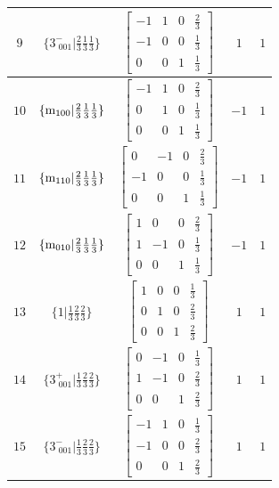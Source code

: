\documentclass[fleqn,8pt]{jsarticle}
\begin{document}
\begin{longtable}{ccccc}
$ 9 $ & $ \{3^{-}_{\,\,001}|\frac{2}{3} \frac{1}{3} \frac{1}{3}\} $ & $ \begin{bmatrix} -1 & 1 & 0 & \frac{2}{3} \\ -1 & 0 & 0 & \frac{1}{3} \\ 0 & 0 & 1 & \frac{1}{3} \end{bmatrix} $ & $ 1 $ & $ 1 $ \\ \hline
$ 10 $ & $ \{{\rm m}_{100}|\frac{2}{3} \frac{1}{3} \frac{1}{3}\} $ & $ \begin{bmatrix} -1 & 1 & 0 & \frac{2}{3} \\ 0 & 1 & 0 & \frac{1}{3} \\ 0 & 0 & 1 & \frac{1}{3} \end{bmatrix} $ & $ -1 $ & $ 1 $ \\ \hline
$ 11 $ & $ \{{\rm m}_{110}|\frac{2}{3} \frac{1}{3} \frac{1}{3}\} $ & $ \begin{bmatrix} 0 & -1 & 0 & \frac{2}{3} \\ -1 & 0 & 0 & \frac{1}{3} \\ 0 & 0 & 1 & \frac{1}{3} \end{bmatrix} $ & $ -1 $ & $ 1 $ \\ \hline
$ 12 $ & $ \{{\rm m}_{010}|\frac{2}{3} \frac{1}{3} \frac{1}{3}\} $ & $ \begin{bmatrix} 1 & 0 & 0 & \frac{2}{3} \\ 1 & -1 & 0 & \frac{1}{3} \\ 0 & 0 & 1 & \frac{1}{3} \end{bmatrix} $ & $ -1 $ & $ 1 $ \\ \hline
$ 13 $ & $ \{1|\frac{1}{3} \frac{2}{3} \frac{2}{3}\} $ & $ \begin{bmatrix} 1 & 0 & 0 & \frac{1}{3} \\ 0 & 1 & 0 & \frac{2}{3} \\ 0 & 0 & 1 & \frac{2}{3} \end{bmatrix} $ & $ 1 $ & $ 1 $ \\ \hline
$ 14 $ & $ \{3^{+}_{\,\,001}|\frac{1}{3} \frac{2}{3} \frac{2}{3}\} $ & $ \begin{bmatrix} 0 & -1 & 0 & \frac{1}{3} \\ 1 & -1 & 0 & \frac{2}{3} \\ 0 & 0 & 1 & \frac{2}{3} \end{bmatrix} $ & $ 1 $ & $ 1 $ \\ \hline
$ 15 $ & $ \{3^{-}_{\,\,001}|\frac{1}{3} \frac{2}{3} \frac{2}{3}\} $ & $ \begin{bmatrix} -1 & 1 & 0 & \frac{1}{3} \\ -1 & 0 & 0 & \frac{2}{3} \\ 0 & 0 & 1 & \frac{2}{3} \end{bmatrix} $ & $ 1 $ & $ 1 $ \\ \hline

\end{longtable}
\end{document}
